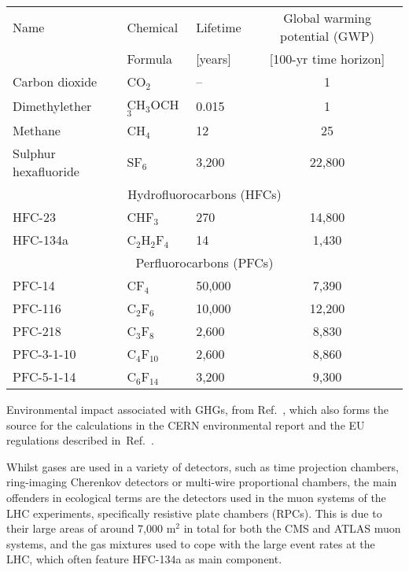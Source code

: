 \documentclass[../SustainableHEP.tex]{subfiles}
\begin{document}
{\centering
{}
\captionsetup{type=table}
\begin{tabular}{@{}lllc@{}}\toprule
Name& Chemical\,\,\; & 
Lifetime\,\,

& Global warming potential (GWP) \\ 
&  Formula& 

[years]
& [100-yr time horizon]\\ 
\midrule
Carbon dioxide &	CO$_2$ & -- & 1 \\
Dimethylether& CH$_3$OCH$_3$ & 0.015 & 1 \\ 
Methane & CH$_4$& 12& 25\\
Sulphur hexafluoride& SF$_6$ & 3,200 & 22,800\\
\midrule
\multicolumn{4}{c}{Hydrofluorocarbons (HFCs)}\\
\midrule
HFC-23 & CHF$_3$ &  270 & 14,800\\
HFC-134a & C$_2$H$_2$F$_4$ & 14 & 1,430\\
\midrule
\multicolumn{4}{c}{Perfluorocarbons (PFCs)}\\
\midrule
PFC-14 & CF$_4$ & 50,000 & 7,390 \\
PFC-116& C$_2$F$_6$ & 10,000  & 12,200\\
PFC-218&C$_3$F$_8$ & 2,600 & 8,830 \\
PFC-3-1-10 &C$_4$F$_{10}$ & 2,600 &8,860\\
PFC-5-1-14 &C$_6$F$_{14}$ & 3,200 & 9,300\\
\bottomrule
\end{tabular}
\caption[Warming potential of selected GHGs]{Environmental impact associated with GHGs, from Ref.~\cite{IPCC17technical}, which also forms the source for the calculations in the CERN environmental report and the EU regulations described in~Ref.~\cite{EUFgasregulation}.}\label{tab:GasImpact}
}

Whilst gases are used in a variety of detectors, such as time projection chambers, ring-imaging Cherenkov detectors or multi-wire proportional chambers, the main offenders in ecological terms are the detectors used in the muon systems of the LHC experiments, specifically resistive plate chambers (RPCs). This is due to their large areas of around 7,000 m$^2$ in total for both the CMS and ATLAS muon systems, and the gas mixtures used to cope with the large event rates at the LHC, which often feature HFC-134a as main component. 
\end{document}
